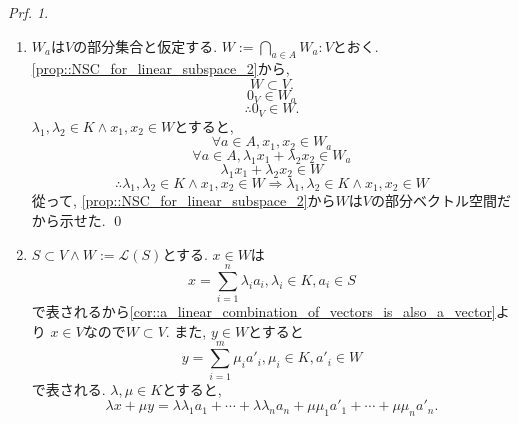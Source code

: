 \documentclass[a4paper,10pt,report]{amsart}
\theoremstyle{plain}
\theoremstyle{definition}
\theoremstyle{remark}
\newtheorem{prf}{Prf.}
\begin{document}
\begin{prf}
    \begin{enumerate}
        \item 
        \(W_{a}\)は\(V\)の部分集合と仮定する. \(W:=\bigcap_{a\in A}W_{a}:V\)とおく. 
        \cref{prop::NSC_for_linear_subspace_2}から, 
        \begin{equation*}
            W\subset V. 
        \end{equation*}
        \begin{equation*}
            0_{V}\in W_{a}
        \end{equation*}
        \begin{equation*}
            \therefore 0_{V}\in W.
        \end{equation*}
        \(\lambda_{1}, \lambda_{2}\in K\wedge x_{1},x_{2}\in W\)とすると,
        \begin{equation*}
            \forall a\in A,x_{1},x_{2}\in W_{a}
        \end{equation*}
        \begin{equation*}
            \forall a\in A,\lambda_{1}x_{1}+\lambda_{2}x_{2}\in W_{a}
        \end{equation*}
        \begin{equation*}
            \lambda_{1}x_{1}+\lambda_{2}x_{2}\in W
        \end{equation*}
        \begin{equation*}
            \therefore \lambda_{1}, \lambda_{2}\in K\wedge x_{1},x_{2}\in W\Rightarrow \lambda_{1}, \lambda_{2}\in K\wedge x_{1},x_{2}\in W
        \end{equation*}
        從って, \cref{prop::NSC_for_linear_subspace_2}から\(W\)は\(V\)の部分ベクトル空間だから示せた. 
        \qed{}
        \item \(S\subset V\wedge W:=\mathcal{L}(S)\)とする. \(x\in W\)は
        \begin{equation*}
            x=\sum_{i=1}^{n}\lambda_{i}a_{i},\lambda_{i}\in K,a_{i}\in S
        \end{equation*}
        で表されるから\cref{cor::a_linear_combination_of_vectors_is_also_a_vector}より
        \(x\in V\)なので\(W\subset V\). また, \(y\in W\)とすると
        \begin{equation*}
            y=\sum_{i=1}^{m}\mu_{i}a'_{i},\mu_{i}\in K,a'_{i}\in W
        \end{equation*}
        で表される. \(\lambda,\mu\in K\)とすると, 
        \begin{equation*}
            \lambda x+\mu y=\lambda\lambda_{1}a_{1}+\cdots+\lambda\lambda_{n}a_{n}+\mu\mu_{1}a'_{1}+\cdots+\mu\mu_{n}a'_{n}. 

\end{equation*}
\end{enumerate}
\end{prf}
\end{document}
